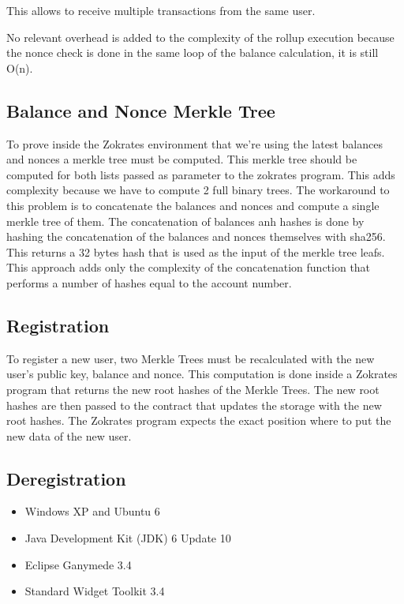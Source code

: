 This allows to receive multiple transactions from the same user.

No relevant overhead is added to the complexity of the rollup execution because the nonce check is done in the same loop of the balance calculation, it is still O(n).

\subsection{Balance and Nonce Merkle Tree}

To prove inside the Zokrates environment that we're using the latest balances and nonces a merkle tree must be computed. This merkle tree should be computed for both lists passed as parameter to the zokrates program. This adds complexity because we have to compute 2 full binary trees. The workaround to this problem is to concatenate the balances and nonces and compute a single merkle tree of them. The concatenation of balances anh hashes is done by hashing the concatenation of the balances and nonces themselves with sha256. This returns a 32 bytes hash that is used as the input of the merkle tree leafs. This approach adds only the complexity of the concatenation function that performs a number of hashes equal to the account number.

\subsection{Registration}

To register a new user, two Merkle Trees must be recalculated with the new user's public key, balance and nonce. This computation is done inside a Zokrates program that returns the new root hashes of the Merkle Trees. The new root hashes are then passed to the contract that updates the storage with the new root hashes. The Zokrates program expects the exact position where to put the new data of the new user.

\subsection{Deregistration}



\begin{itemize}
		\item Windows XP and Ubuntu 6
		\vspace{-0.1in} 
		\item Java Development Kit (JDK) 6 Update 10 
		\vspace{-0.1in} 
		\item Eclipse Ganymede 3.4
		\vspace{-0.1in} 
		\item Standard Widget Toolkit 3.4
\end{itemize}

